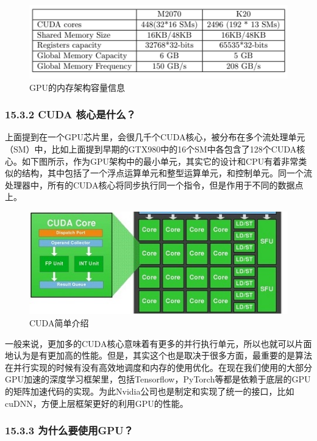\begin{figure}
\centering
\includegraphics{./img/ch15/gpu_memory.png}
\caption{GPU的内存架构容量信息}
\end{figure}

\subsubsection{15.3.2 CUDA
核心是什么？}\label{cuda-ux6838ux5fc3ux662fux4ec0ux4e48}

上面提到在一个GPU芯片里，会很几千个CUDA核心，被分布在多个流处理单元（SM）中，比如上面提到早期的GTX980中的16个SM中各包含了128个CUDA核心。如下图所示，作为GPU架构中的最小单元，其实它的设计和CPU有着非常类似的结构，其中包括了一个浮点运算单元和整型运算单元，和控制单元。同一个流处理器中，所有的CUDA核心将同步执行同一个指令，但是作用于不同的数据点上。

\begin{figure}
\centering
\includegraphics{./img/ch15/cudacore.jpg}
\caption{CUDA简单介绍}
\end{figure}

一般来说，更加多的CUDA核心意味着有更多的并行执行单元，所以也就可以片面地认为是有更加高的性能。但是，其实这个也是取决于很多方面，最重要的是算法在并行实现的时候有没有高效地调度和内存的使用优化。在现在我们使用的大部分GPU加速的深度学习框架里，包括Tensorflow，PyTorch等都是依赖于底层的GPU的矩阵加速代码的实现。为此Nvidia公司也是制定和实现了统一的接口，比如cuDNN，方便上层框架更好的利用GPU的性能。

\subsubsection{15.3.3
为什么要使用GPU？}\label{ux4e3aux4ec0ux4e48ux8981ux4f7fux7528gpu}

